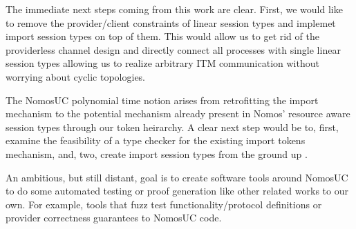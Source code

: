 The immediate next steps coming from this work are clear.
First, we would like to remove the provider/client constraints of linear session types and implemet import session types on top of them.
This would allow us to get rid of the providerless channel design and directly connect all processes with single linear session types allowing us to realize arbitrary
ITM communication without worrying about cyclic topologies. 

The NomosUC polynomial time notion arises from retrofitting the import mechanism to the potential mechanism already present in Nomos' resource aware session types through our token heirarchy.
A clear next step would be to, first, examine the feasibility of a type checker for the existing import tokens mechanism, and, two, create import session types from the ground up .

An ambitious, but still distant, goal is to create software tools around NomosUC to do some automated testing or proof generation like other related works to our own. For example, tools that fuzz test functionality/protocol definitions or provider correctness guarantees to NomosUC code. 

